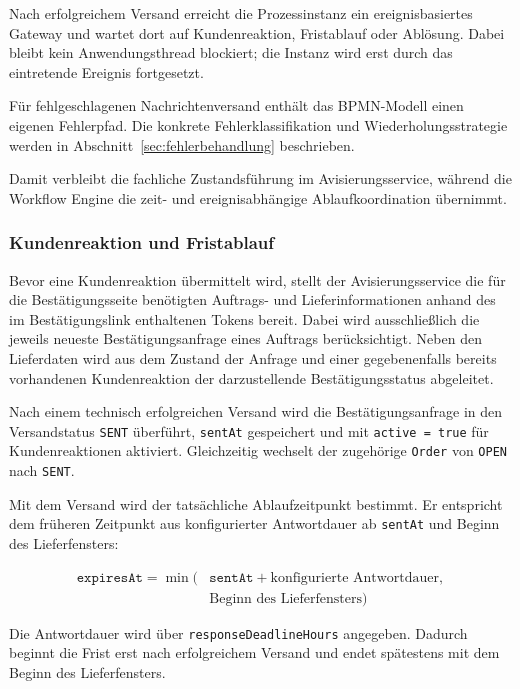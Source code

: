 Nach erfolgreichem Versand erreicht die Prozessinstanz ein ereignisbasiertes
Gateway und wartet dort auf Kundenreaktion, Fristablauf oder Ablösung. Dabei
bleibt kein Anwendungsthread blockiert; die Instanz wird erst durch das
eintretende Ereignis fortgesetzt.

Für fehlgeschlagenen Nachrichtenversand enthält das BPMN-Modell einen eigenen
Fehlerpfad. Die konkrete Fehlerklassifikation und Wiederholungsstrategie werden
in Abschnitt~\ref{sec:fehlerbehandlung} beschrieben.

Damit verbleibt die fachliche Zustandsführung im Avisierungsservice, während
die Workflow Engine die zeit- und ereignisabhängige Ablaufkoordination
übernimmt.

\subsubsection{Kundenreaktion und Fristablauf}
\label{sec:kundenreaktion-fristablauf}

Bevor eine Kundenreaktion übermittelt wird, stellt der Avisierungsservice die
für die Bestätigungsseite benötigten Auftrags- und Lieferinformationen anhand
des im Bestätigungslink enthaltenen Tokens bereit. Dabei wird ausschließlich
die jeweils neueste Bestätigungsanfrage eines Auftrags berücksichtigt.
Neben den Lieferdaten wird aus dem Zustand der Anfrage und einer gegebenenfalls
bereits vorhandenen Kundenreaktion der darzustellende Bestätigungsstatus
abgeleitet.

Nach einem technisch erfolgreichen Versand wird die Bestätigungsanfrage in
den Versandstatus \texttt{SENT} überführt, \texttt{sentAt} gespeichert und mit
\texttt{active = true} für Kundenreaktionen aktiviert. Gleichzeitig wechselt
der zugehörige \texttt{Order} von \texttt{OPEN} nach \texttt{SENT}.

Mit dem Versand wird der tatsächliche Ablaufzeitpunkt bestimmt. Er entspricht
dem früheren Zeitpunkt aus konfigurierter Antwortdauer ab
\texttt{sentAt} und Beginn des Lieferfensters:

\[
\begin{aligned}
	\texttt{expiresAt}
	= \min\!\bigl(
	&\texttt{sentAt} + \text{konfigurierte Antwortdauer}, \\
	&\text{Beginn des Lieferfensters}
	\bigr)
\end{aligned}
\]

Die Antwortdauer wird über \texttt{responseDeadlineHours} angegeben. Dadurch
beginnt die Frist erst nach erfolgreichem Versand und endet spätestens mit dem
Beginn des Lieferfensters.

